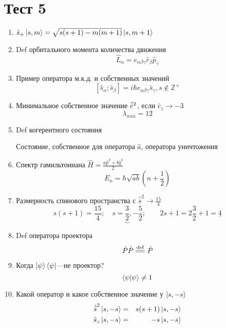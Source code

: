\section{Тест 5}
\begin{enumerate}
    \item $\Hat s_+ \ket{s,m} = \sqrt{s(s+1)-m(m+1)}\ket{s,m+1}$
    \item Def орбитального момента количества движения
        $$\hat L_\alpha = e_{\alpha\beta\gamma}\hat r_\beta \hat 
p_\gamma$$
    \item Пример оператора м.к.д. и собственных значений
$$[\hat s_\alpha;\hat s_\beta] = i\hbar e_{\alpha\beta\gamma}\hat 
s_\gamma, s\not \in \mathbb Z^+$$
    \item Минимальное собственное значение $\Hat{\bar e}^2$, если $\hat 
e_z \to -3$
$$\lambda_{min}=12$$
    \item Def когерентного состояния

        Состояние, собственное для оператора $\hat a$, оператора уничтожения
    \item Спектр гамильтониана $\hat H=\frac{a{\hat p}^2+b{\hat q}^2}{2}$
        $$E_n = \hbar\sqrt{ab}\left(n+\frac{1}{2}\right)$$
    \item Размерность спинового пространства с $\hat{\bar s}^2\to \frac{15}{4}$
        $$s(s+1)=\frac{15}{4};\quad s=\underbrace{\frac{3}{2}},-\frac{5}{2}; \qquad 2s+1=2\frac{3}{2}+1=\underline{4}$$
    \item Def оператора проектора
       $$\Hat P\Hat P\eqdef\hat P$$
   \item Когда $\ket{\psi}\bra{\psi}$---не проектор?
       $$\braket{\psi|\psi}\neq 1$$
   \item Какой оператор и какое собственное значение у $\ket{s,-s}$
       \begin{eqnarray}
           {\Hat{\bar s}}^2\ket{s,-s}&=&s(s+1)\ket{s,-s}\\
           \hat s_z\ket{s,-s}&=&-s\ket{s,-s}
       \end{eqnarray}
\end{enumerate}
